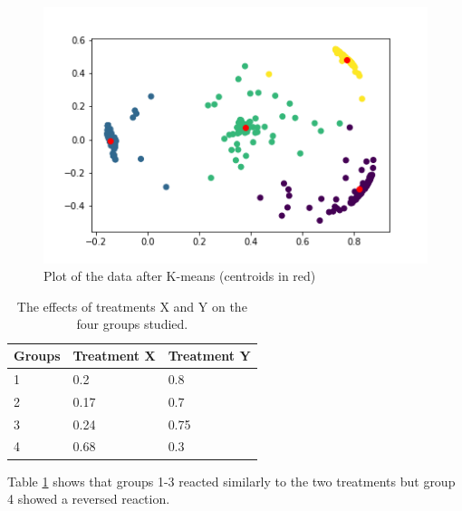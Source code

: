 \documentclass[idxtotoc,hyperref,openany]{labbook} %
\begin{document}
\begin{figure}[h]
\includegraphics[width=0.9\linewidth]{KMeans_Plot_Accelerometer_Day1_Selected.png}
\setlength\belowcaptionskip{-10pt}
\caption{Plot of the data after K-means (centroids in red)}
\label{K-Means plot 1 Selected}
\end{figure}





\begin{table}[H]
\begin{tabular}{l l l}
\toprule
\textbf{Groups} & \textbf{Treatment X} & \textbf{Treatment Y} \\
\toprule
1 & 0.2 & 0.8\\
2 & 0.17 & 0.7\\
3 & 0.24 & 0.75\\
4 & 0.68 & 0.3\\
\bottomrule
\end{tabular}
\caption{The effects of treatments X and Y on the four groups studied.}
\label{tab:treatments_xy}
\end{table}

Table \ref{tab:treatments_xy} shows that groups 1-3 reacted similarly to the two treatments but group 4 showed a reversed reaction.



\end{document}
